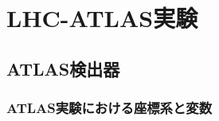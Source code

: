 \chapter{LHC-ATLAS実験}
\label{chap_TGC}




\section{ATLAS検出器}
\label{sec_ATLAS}
    \subsection{ATLAS実験における座標系と変数}


